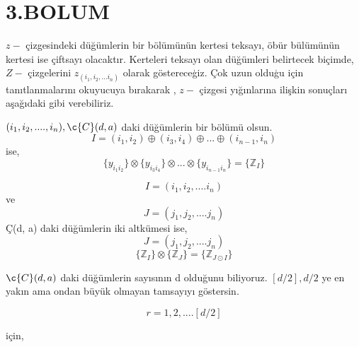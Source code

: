 \documentclass[11pt]{amsbook}
\begin{document}
\chapter{3.BOLUM}



$z-$ \c{c}izgesindeki d\"{u}\u{g}\"{u}mlerin bir b\"{o}l\"{u}m\"{u}n\"{u}n kertesi teksay{\i}, \"{o}b\"{u}r b\"{u}l\"{u}m\"{u}n\"{u}n kertesi ise \c{c}iftsay{\i} olacakt{\i}r. Kerteleri teksay{\i} olan d\"{u}\u{g}\"{u}mleri belirtecek bi\c{c}imde, $Z-$  \c{c}izgelerini $z_(i_1, i_2, ... i_n)$ olarak g\"{o}sterece\c{g}iz. \c{C}ok uzun oldu\c{g}u i\c{c}in tan{\i}tlanmalar{\i}n{\i} okuyucuya b{\i}rakarak , $z-$ \c{c}izgesi y{\i}\u{g}{\i}nlar{\i}na ili\c{s}kin sonu\c{c}lar{\i} a\c{s}a\u{g}{\i}daki gibi verebiliriz.\\
\begin{theorem}
$(i_1, i_2,....,i_n) , \c{C}(d, a)$ daki  d\"{u}\u{g}\"{u}mlerin bir b\"{o}l\"{u}m\"{u} olsun.
\begin{equation}
I = (i_1, i_2) \oplus(i_3, i_4) \oplus...\oplus(i_{n-1}, i_n)
\end{equation}
ise,
\begin{equation}
\lbrace y_{i_1i_2} \rbrace\otimes\lbrace y_{i_3i_4} \rbrace\otimes...\otimes\lbrace y_{i_{n-1}i_n} \rbrace = \lbrace \mathbb{Z}_I \rbrace
\end{equation}
\end{theorem}
\begin{theorem}
\begin{equation}
I = (i_1, i_2, .... i_n) 
\end{equation}
ve
\begin{equation}
J = (j_1, j_2, .... j_n) 
\end{equation}
\c{C}(d, a) daki d\"{u}\u{g}\"{u}mlerin iki altk\"{u}mesi ise,
\begin{equation}
J = (j_1, j_2, .... j_n) 
\end{equation}
\begin{equation}
\lbrace \mathbb{Z}_I \rbrace \otimes \lbrace \mathbb{Z}_J\rbrace = \lbrace \mathbb{Z}_{J\odot I} \rbrace
\end{equation}
\end{theorem}

$\c{C}(d, a)$ daki d\"{u}\u{g}\"{u}mlerin say{\i}s{\i}n{\i}n d oldu\u{g}unu biliyoruz. $[d/2], d/2 $ ye en yak{\i}n ama ondan b\"{u}y\"{u}k olmayan tamsay{\i}y{\i} g\"{o}stersin.

\begin{equation}
r = 1, 2 , .... [d/2]
\end{equation}

i\c{c}in,
\end{document}
